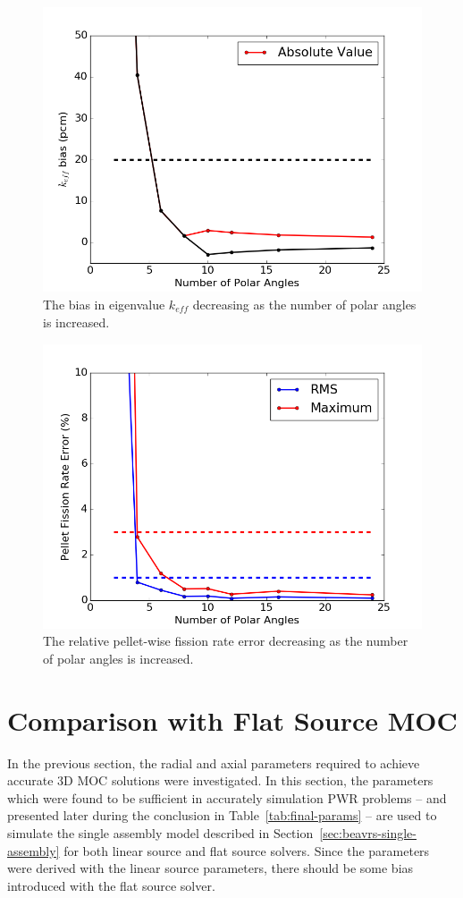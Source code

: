 \begin{figure}[h!]
	\centering
	\includegraphics[width=0.7\linewidth]{figures/results/sensitivity/rodded_polar_angles_pcm.png}
	\caption[]{The bias in eigenvalue $k_{\textit{eff}}$ decreasing as the number of polar angles is increased.}
	\label{fig:rodded-polar-angles-pcm}
\end{figure}
\begin{figure}[h!]
	\centering
	\includegraphics[width=0.7\linewidth]{figures/results/sensitivity/rodded_polar_angles_fr.png}
	\caption[]{The relative pellet-wise fission rate error decreasing as the number of polar angles is increased.}
	\label{fig:rodded-polar-angles-fr}
\end{figure}

\section{Comparison with Flat Source MOC}
\label{sec:flat-linear-comparison}

In the previous section, the radial and axial parameters required to achieve accurate 3D \ac{MOC} solutions were investigated. In this section, the parameters which were found to be sufficient in accurately simulation \ac{PWR} problems -- and presented later during the conclusion in Table~\ref{tab:final-params} -- are used to simulate the single assembly model described in Section~\ref{sec:beavrs-single-assembly} for both linear source and flat source solvers. Since the parameters were derived with the linear source parameters, there should be some bias introduced with the flat source solver.

